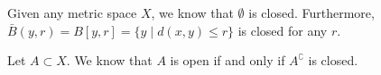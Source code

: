 \begin{corollary}
Given any metric space $X$, we know that $\emptyset$ is closed. Furthermore, $\bar{B}(y,r) = B[y,r] = \{y \mid d(x,y) \leq r \}$ is closed for any $r$.
\end{corollary}

\begin{proposition}
Let $A \subset X$. We know that $A$ is open if and only if $A^\complement$ is closed.
\end{proposition}